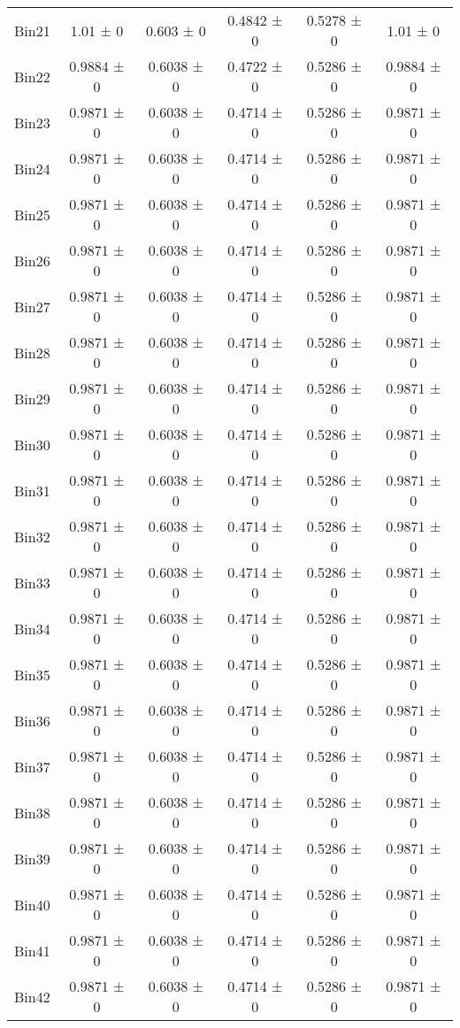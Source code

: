 \begin{tabular}{@{\extracolsep{4pt}}lccccc@{}}
     Bin21 & 1.01 ± 0 & 0.603 ± 0 & 0.4842 ± 0 & 0.5278 ± 0 & 1.01 ± 0 \\ 
     Bin22 & 0.9884 ± 0 & 0.6038 ± 0 & 0.4722 ± 0 & 0.5286 ± 0 & 0.9884 ± 0 \\ 
     Bin23 & 0.9871 ± 0 & 0.6038 ± 0 & 0.4714 ± 0 & 0.5286 ± 0 & 0.9871 ± 0 \\ 
     Bin24 & 0.9871 ± 0 & 0.6038 ± 0 & 0.4714 ± 0 & 0.5286 ± 0 & 0.9871 ± 0 \\ 
     Bin25 & 0.9871 ± 0 & 0.6038 ± 0 & 0.4714 ± 0 & 0.5286 ± 0 & 0.9871 ± 0 \\ 
     Bin26 & 0.9871 ± 0 & 0.6038 ± 0 & 0.4714 ± 0 & 0.5286 ± 0 & 0.9871 ± 0 \\ 
     Bin27 & 0.9871 ± 0 & 0.6038 ± 0 & 0.4714 ± 0 & 0.5286 ± 0 & 0.9871 ± 0 \\ 
     Bin28 & 0.9871 ± 0 & 0.6038 ± 0 & 0.4714 ± 0 & 0.5286 ± 0 & 0.9871 ± 0 \\ 
     Bin29 & 0.9871 ± 0 & 0.6038 ± 0 & 0.4714 ± 0 & 0.5286 ± 0 & 0.9871 ± 0 \\ 
     Bin30 & 0.9871 ± 0 & 0.6038 ± 0 & 0.4714 ± 0 & 0.5286 ± 0 & 0.9871 ± 0 \\ 
     Bin31 & 0.9871 ± 0 & 0.6038 ± 0 & 0.4714 ± 0 & 0.5286 ± 0 & 0.9871 ± 0 \\ 
     Bin32 & 0.9871 ± 0 & 0.6038 ± 0 & 0.4714 ± 0 & 0.5286 ± 0 & 0.9871 ± 0 \\ 
     Bin33 & 0.9871 ± 0 & 0.6038 ± 0 & 0.4714 ± 0 & 0.5286 ± 0 & 0.9871 ± 0 \\ 
     Bin34 & 0.9871 ± 0 & 0.6038 ± 0 & 0.4714 ± 0 & 0.5286 ± 0 & 0.9871 ± 0 \\ 
     Bin35 & 0.9871 ± 0 & 0.6038 ± 0 & 0.4714 ± 0 & 0.5286 ± 0 & 0.9871 ± 0 \\ 
     Bin36 & 0.9871 ± 0 & 0.6038 ± 0 & 0.4714 ± 0 & 0.5286 ± 0 & 0.9871 ± 0 \\ 
     Bin37 & 0.9871 ± 0 & 0.6038 ± 0 & 0.4714 ± 0 & 0.5286 ± 0 & 0.9871 ± 0 \\ 
     Bin38 & 0.9871 ± 0 & 0.6038 ± 0 & 0.4714 ± 0 & 0.5286 ± 0 & 0.9871 ± 0 \\ 
     Bin39 & 0.9871 ± 0 & 0.6038 ± 0 & 0.4714 ± 0 & 0.5286 ± 0 & 0.9871 ± 0 \\ 
     Bin40 & 0.9871 ± 0 & 0.6038 ± 0 & 0.4714 ± 0 & 0.5286 ± 0 & 0.9871 ± 0 \\ 
     Bin41 & 0.9871 ± 0 & 0.6038 ± 0 & 0.4714 ± 0 & 0.5286 ± 0 & 0.9871 ± 0 \\ 
     Bin42 & 0.9871 ± 0 & 0.6038 ± 0 & 0.4714 ± 0 & 0.5286 ± 0 & 0.9871 ± 0 \\ 

\end{tabular}
